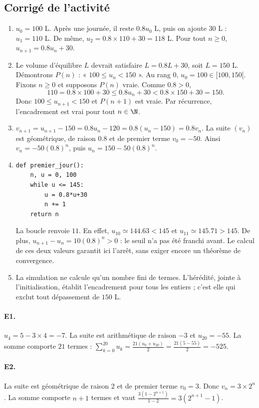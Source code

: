 \subsection{Corrigé de l'activité}\begin{enumerate}
\item $u_0=100$ L. Après une journée, il reste $\num{0,8}u_0$ L, puis on ajoute $30$ L : $u_1=110$ L. De même, $u_2=\num{0,8}\times110+30=118$ L. Pour tout $n\ge0$, $u_{n+1}=\num{0,8}u_n+30$.
\item Le volume d'équilibre $L$ devrait satisfaire $L=\num{0,8}L+30$, soit $L=150$ L. Démontrons $P(n)$ : « $100\le u_n<150$ ». Au rang $0$, $u_0=100\in[100,150[$. Fixons $n\ge0$ et supposons $P(n)$ vraie. Comme $\num{0,8}>0$,
\[110=\num{0,8}\times100+30\le\num{0,8}u_n+30<\num{0,8}\times150+30=150.\]
Donc $100\le u_{n+1}<150$ et $P(n+1)$ est vraie. Par récurrence, l'encadrement est vrai pour tout $n\in\N$.
\item $v_{n+1}=u_{n+1}-150=\num{0,8}u_n-120=\num{0,8}(u_n-150)=\num{0,8}v_n$. La suite $(v_n)$ est géométrique, de raison $\num{0,8}$ et de premier terme $v_0=-50$. Ainsi $v_n=-50(\num{0,8})^n$, puis $u_n=150-50(\num{0,8})^n$.
\item 
\begin{lstlisting}
def premier_jour():
    n, u = 0, 100
    while u <= 145:
        u = 0.8*u+30
        n += 1
    return n
\end{lstlisting}
La boucle renvoie $11$. En effet, $u_{10}\simeq\num{144,63}<145$ et $u_{11}\simeq\num{145,71}>145$. De plus, $u_{n+1}-u_n=10(\num{0,8})^n>0$ : le seuil n'a pas été franchi avant. Le calcul de ces deux valeurs garantit ici l'arrêt, sans exiger encore un théorème de convergence.
\item La simulation ne calcule qu'un nombre fini de termes. L'hérédité, jointe à l'initialisation, établit l'encadrement pour tous les entiers ; c'est elle qui exclut tout dépassement de $150$ L.
\end{enumerate}

\paragraph{E1.}$u_4=5-3\times4=-7$. La suite est arithmétique de raison $-3$ et $u_{20}=-55$. La somme comporte $21$ termes : $\sum_{k=0}^{20}u_k=\frac{21(u_0+u_{20})}{2}=\frac{21(5-55)}{2}=-525$.

\paragraph{E2.}La suite est géométrique de raison $2$ et de premier terme $v_0=3$. Donc $v_n=3\times2^n$. La somme comporte $n+1$ termes et vaut $\frac{3(1-2^{n+1})}{1-2}=3(2^{n+1}-1)$.

